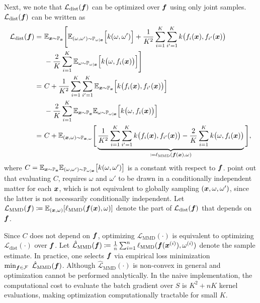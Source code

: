Next, we note that $\mathcal{L}_{\text{dist}}(\boldsymbol{f}) $ can be optimized over $\boldsymbol{f}$ using only joint samples. $\mathcal{L}_{\text{dist}}(\boldsymbol{f}) $ can be written as
\begin{equation*}
  \begin{aligned}
  \mathcal{L}_{\text{dist}}(\boldsymbol{f}) =\ & \mathbb{E}_{\boldsymbol{x} \sim \mathbb{P}_{\boldsymbol{x}}} {\Bigg [} \mathbb{E}_{(\omega, \omega') \sim \mathbb{P}_{\omega|\boldsymbol{x}}}{\Big[}k(\omega, \omega'){\Big]} + \frac{1}{K^2} \sum_{i=1}^K \sum_{i' = 1}^K k{\big (} f_i(\boldsymbol{x}), f_{i'}(\boldsymbol{x}) {\big )}  \\ 
   \quad & -\frac{2}{K} \sum_{i=1}^K \mathbb{E}_{\omega \sim \mathbb{P}_{\omega|\boldsymbol{x}}}{\Big[} k {\big (} \omega, f_i(\boldsymbol{x}) {\big )}{\Big]} 
  {\Bigg]}  \\
  =\ & C + \frac{1}{K^2} \sum_{i=1}^K \sum_{i' = 1}^K \mathbb{E}_{\boldsymbol{x} \sim \mathbb{P}_{\boldsymbol{x}}} {\Big[} k {\big (} f_i(\boldsymbol{x}), f_{i'}(\boldsymbol{x}) {\big )} {\Big]} \\
  \quad & -\frac{2}{K} \sum_{i=1}^K \mathbb{E}_{\boldsymbol{x} \sim \mathbb{P}_{\boldsymbol{x}}} \mathbb{E}_{\omega \sim \mathbb{P}_{\omega|\boldsymbol{x}}} {\Big[} k {\big (} \omega, f_i(\boldsymbol{x}) {\big )}{\Big]} \\
   = \ & C + \mathbb{E}_{(\boldsymbol{x}, \omega) \sim \mathbb{P}_{\boldsymbol{x},\omega}} {\Bigg [} \underbrace{\frac{1}{K^2} \sum_{i=1}^K \sum_{i' = 1}^K k{\big (} f_i(\boldsymbol{x}), f_{i'}(\boldsymbol{x}) {\big )} - \frac{2}{K} \sum_{i=1}^K  k {\big (} \omega, f_i(\boldsymbol{x}) {\big )}}_{\coloneq \ell_{\text{MMD}}(\boldsymbol{f}(\boldsymbol{x}), \omega)} {\Bigg ],}
  \end{aligned}
  \end{equation*}  
where $C = \mathbb{E}_{\boldsymbol{x} \sim \mathbb{P}_{\boldsymbol{x}}} \mathbb{E}_{(\omega, \omega') \sim \mathbb{P}_{\omega|\boldsymbol{x}}}{\big[}k(\omega, \omega'){\big]}$ is a constant with respect to $\boldsymbol{f}$. \hbox{\citet{huang2022evaluating}} point out that evaluating $C$, requires $\omega$ and $\omega'$ to be drawn in a conditionally independent matter for each $\boldsymbol{x}$, which is not equivalent to globally sampling $(\boldsymbol{x}, \omega, \omega')$, since the latter is not necessarily conditionally independent. Let $\mathcal{L}_{\text{MMD}}(\boldsymbol{f}) \coloneq \mathbb{E}_{(\boldsymbol{x}, \omega)} [\ell_{\text{MMD}}(\boldsymbol{f}(\boldsymbol{x}), \omega)]$ denote the part of $\mathcal{L}_{\text{dist}}(\boldsymbol{f})$ that depends on $\boldsymbol{f}$. 

Since $C$ does not depend on $\boldsymbol{f}$, optimizing $\mathcal{L}_{\text{MMD}}(\cdot)$ is equivalent to optimizing $\mathcal{L}_{\text{dist}}(\cdot)$ over $\boldsymbol{f}$. Let $\hat{\mathcal{L}}_{\text{MMD}}(\boldsymbol{f}) \coloneq \frac{1}{n} \sum_{i=1}^n \ell_{\text{MMD}}(\boldsymbol{f}(\boldsymbol{x}^{(i)}), \omega^{(i)})$ denote the sample estimate. In practice, one selects $\boldsymbol{f}$ via empirical loss minimization
$
\min_{\bs{f} \in \mathcal{F}} \ \hat{\mathcal{L}}_{\text{MMD}}(\bs{f})
$.
Although $\hat{\mathcal{L}}_{\text{MMD}}(\cdot)$ is non-convex in general and optimization cannot be performed analytically. In the naive implementation, the computational cost to evaluate the batch gradient over $S$ is $K^2 + nK$ kernel evaluations, making optimization computationally tractable for small $K$. 



